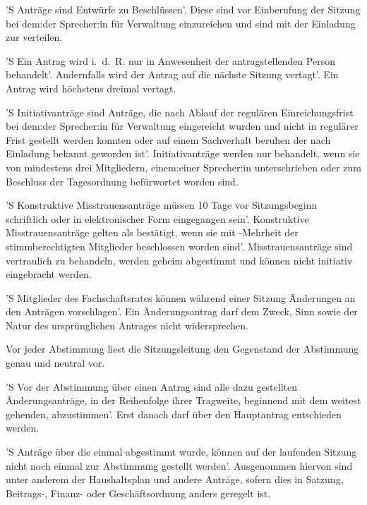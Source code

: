 \documentclass[%
    parskip=half,
]{scrartcl}
\begin{document}
\begin{contract}

'S Anträge sind Entwürfe zu Beschlüssen'.
Diese sind vor Einberufung der Sitzung bei dem:der Sprecher:in für Verwaltung einzureichen und sind mit der Einladung zur verteilen.

'S Ein Antrag wird i.~d.~R. nur in Anwesenheit der antragstellenden Person behandelt'.
Andernfalls wird der Antrag auf die nächste Sitzung vertagt'.
Ein Antrag wird höchstens dreimal vertagt.

'S Initiativanträge sind Anträge, die nach Ablauf der regulären Einreichungsfrist bei dem:der Sprecher:in für Verwaltung eingereicht wurden und nicht in regulärer Frist gestellt werden konnten oder auf einem Sachverhalt beruhen der nach Einladung bekannt geworden ist'.
Initiativanträge werden nur behandelt, wenn sie von mindestens drei Mitgliedern, einem:einer Sprecher:in unterschrieben oder zum Beschluss der Tagesordnung befürwortet worden sind.

'S Konstruktive Misstrauensanträge müssen 10 Tage vor Sitzungsbeginn schriftlich oder in elektronischer Form eingegangen sein'.
Konstruktive Misstrauensanträge gelten als bestätigt, wenn sie mit -Mehrheit der stimmberechtigten Mitglieder beschlossen worden sind'.
Misstrauensanträge sind vertraulich zu behandeln, werden geheim abgestimmt und können nicht initiativ eingebracht werden.

'S Mitglieder des Fachschaftsrates können während einer Sitzung Änderungen an den Anträgen vorschlagen'.
Ein Änderungsantrag darf dem Zweck, Sinn sowie der Natur des ursprünglichen Antrages nicht widersprechen.


Vor jeder Abstimmung liest die Sitzungsleitung den Gegenstand der Abstimmung genau und neutral vor.

'S Vor der Abstimmung über einen Antrag sind alle dazu gestellten Änderungsanträge, in der Reihenfolge ihrer Tragweite, beginnend mit dem weitest gehenden, abzustimmen'.
Erst danach darf über den Hauptantrag entschieden werden.

'S Anträge über die einmal abgestimmt wurde, können auf der laufenden Sitzung nicht noch einmal zur Abstimmung gestellt werden'.
Ausgenommen hiervon sind unter anderem der Haushaltsplan und andere Anträge, sofern dies in Satzung, Beitrags-, Finanz- oder Geschäftsordnung anders geregelt ist.

\end{contract}
\end{document}
